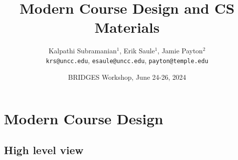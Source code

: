 \documentclass[aspectratio=169]{beamer}
\title{Modern Course Design and CS Materials}
\subtitle{}
\author{Kalpathi Subramanian$^1$, Erik Saule$^1$, Jamie Payton$^2$\\\texttt{krs@uncc.edu}, \texttt{esaule@uncc.edu}, \texttt{payton@temple.edu} }
\institute{$^1$The University of North Carolina at Charlotte\\$^2$Temple University}
\date{BRIDGES Workshop, June 24-26, 2024}
\begin{document}
\begin{frame}
\titlepage
\end{frame}




\section{Modern Course Design}

\subsection{High level view}
\end{document}
